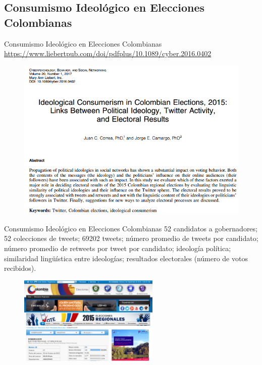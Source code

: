 \documentclass{beamer}
\begin{document}
\subsection{Consumismo Ideológico en Elecciones Colombianas}
\begin{frame}{Consumismo Ideológico en Elecciones Colombianas}
\tiny{\textcolor{blue}{\url{https://www.liebertpub.com/doi/pdfplus/10.1089/cyber.2016.0402}}}
\begin{figure}
\centering
 \includegraphics[width=.85\textwidth]{paper}
 \end{figure}
\end{frame}

\begin{frame}{Consumismo Ideológico en Elecciones Colombianas}
52 candidatos a gobernadores; 52 colecciones de tweets; 69202 tweets; número promedio de tweets por candidato; número promedio de retweets por tweet por candidato; ideología política; similaridad lingüística entre ideologías; resultados electorales (número de votos recibidos).
\begin{figure}
\centering
 \includegraphics[width=0.6\textwidth]{art3}
 \end{figure}
\end{frame}
\end{document}

